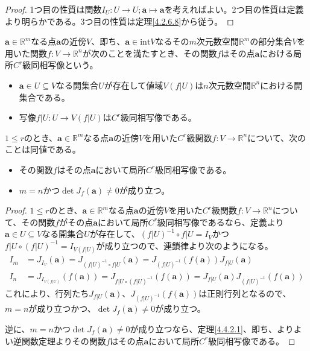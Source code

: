 \documentclass[dvipdfmx]{jsarticle}
\begin{document}
\begin{proof}
1つ目の性質は関数$I_{U}:U \rightarrow U;\mathbf{a} \mapsto \mathbf{a}$を考えればよい。2つ目の性質は定義より明らかである。3つ目の性質は定理\ref{4.2.6.8}から従う。
\end{proof}
\begin{dfn}
$\mathbf{a} \in \mathbb{R}^{m}$なる点$\mathbf{a}$の近傍$V$、即ち、$\mathbf{a} \in \mathrm{int}V$なるその$m$次元数空間$\mathbb{R}^{m}$の部分集合$V$を用いた関数$f:V \rightarrow \mathbb{R}^{n}$が次のことを満たすとき、その関数$f$はその点$\mathbf{a}$における局所$C^{r}$級同相写像という。
\begin{itemize}
\item
  $\mathbf{a} \in U \subseteq V$なる開集合$U$が存在して値域$V\left( f|U \right)$は$n$次元数空間$\mathbb{R}^{n}$における開集合である。
\item
  写像$f|U:U \rightarrow V\left( f|U \right)$は$C^{r}$級同相写像である。
\end{itemize}
\end{dfn}
\begin{thm}\label{4.4.2.3}
$1 \leq r$のとき、$\mathbf{a} \in \mathbb{R}^{m}$なる点$\mathbf{a}$の近傍$V$を用いた$C^{r}$級関数$f:V \rightarrow \mathbb{R}^{n}$について、次のことは同値である。
\begin{itemize}
\item
  その関数$f$はその点$\mathbf{a}$において局所$C^{r}$級同相写像である。
\item
  $m = n$かつ$\det J_{f}\left( \mathbf{a} \right) \neq 0$が成り立つ。
\end{itemize}
\end{thm}
\begin{proof}
$1 \leq r$のとき、$\mathbf{a} \in \mathbb{R}^{m}$なる点$\mathbf{a}$の近傍$V$を用いた$C^{r}$級関数$f:V \rightarrow \mathbb{R}^{n}$について、その関数$f$がその点$\mathbf{a}$において局所$C^{r}$級同相写像であるなら、定義より$\mathbf{a} \in U \subseteq V$なる開集合$U$が存在して、$\left( f|U \right)^{- 1} \circ f|U = I_{V}$かつ$f|U \circ \left( f|U \right)^{- 1} = I_{V\left( f|U \right)}$が成り立つので、連鎖律より次のようになる。
\begin{align*}
I_{m} &= J_{I_{V}}\left( \mathbf{a} \right) = J_{\left( f|U \right)^{- 1} \circ f|U}\left( \mathbf{a} \right) = J_{\left( f|U \right)^{- 1}}\left( f\left( \mathbf{a} \right) \right)J_{f|U}\left( \mathbf{a} \right)\\
I_{n} &= J_{I_{V\left( f|U \right)}}\left( f\left( \mathbf{a} \right) \right) = J_{f|U \circ \left( f|U \right)^{- 1}}\left( f\left( \mathbf{a} \right) \right) = J_{f|U}\left( \mathbf{a} \right)J_{\left( f|U \right)^{- 1}}\left( f\left( \mathbf{a} \right) \right)
\end{align*}
これにより、行列たち$J_{f|U}\left( \mathbf{a} \right)$、$J_{\left( f|U \right)^{- 1}}\left( f\left( \mathbf{a} \right) \right)$は正則行列となるので、$m = n$が成り立つかつ、$\det J_{f}\left( \mathbf{a} \right) \neq 0$が成り立つ。\par
逆に、$m = n$かつ$\det J_{f}\left( \mathbf{a} \right) \neq 0$が成り立つなら、定理\ref{4.4.2.1}、即ち、よりよい逆関数定理よりその関数$f$はその点$\mathbf{a}$において局所$C^{r}$級同相写像である。
\end{proof}
\end{document}
